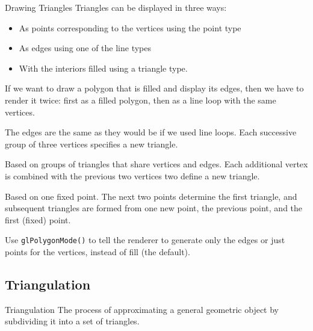 \documentclass[../notes.tex]{subfiles}
\begin{document}
        \begin{sidenote}{Drawing Triangles}
          Triangles can be displayed in three ways:
          \begin{itemize}[nosep]
            \item As points corresponding to the vertices using the point type
            \item As edges using one of the line types
            \item With the interiors filled using a triangle type.
          \end{itemize}

          If we want to draw a polygon that is filled and display its edges,
          then we have to render it twice: first as a filled polygon,
          then as a line loop with the same vertices.
          
          \begin{descriptimize}[nosep]
            \item[Triangles (\texttt{gl.TRIANGLES})] The edges are the same
              as they would be if we used line loops.
              Each successive group of three vertices specifies a new triangle.
            \item[Triangle Strip (\texttt{gl.TRIANGLE_STRIP})]
              Based on groups of triangles that share vertices and edges.
              Each additional vertex is combined with the previous two vertices
              two define a new triangle.
            \item[Triangle Fan (\texttt{gl.TRIANGLE_FAN})]
              Based on one fixed point.
              The next two points determine the first triangle,
              and subsequent triangles are formed from one new point,
              the previous point, and the first (fixed) point.
          \end{descriptimize}

          Use \texttt{glPolygonMode()} to tell the renderer to generate
          only the edges or just points for the vertices, instead of fill (the default).
        \end{sidenote}

      \subsection{Triangulation}
        \begin{definition}{Triangulation}
          The process of approximating a general geometric object by subdividing it into
          a set of triangles.
        \end{definition}
\end{document}
